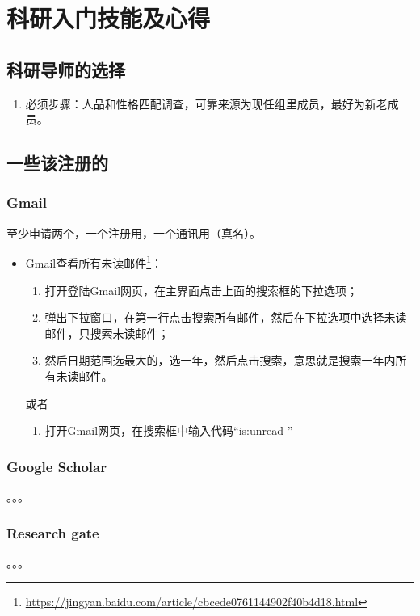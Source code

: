 
\chapter{科研入门技能及心得}
\section{科研导师的选择}
\begin{enumerate}
\item 必须步骤：人品和性格匹配调查，可靠来源为现任组里成员，最好为新老成员。
\end{enumerate}



\section{一些该注册的}
\subsection{Gmail}
 至少申请两个，一个注册用，一个通讯用（真名）。

\begin{itemize}
\item Gmail查看所有未读邮件\footnote{\url{https://jingyan.baidu.com/article/cbcede0761144902f40b4d18.html}}：
\begin{enumerate}
\item 打开登陆Gmail网页，在主界面点击上面的搜索框的下拉选项；
\item 弹出下拉窗口，在第一行点击搜索所有邮件，然后在下拉选项中选择未读邮件，只搜索未读邮件；
\item 然后日期范围选最大的，选一年，然后点击搜索，意思就是搜索一年内所有未读邮件。
\end{enumerate}
或者
\begin{enumerate}
\item 打开Gmail网页，在搜索框中输入代码“is:unread ”
\end{enumerate}
\end{itemize}



\subsection{Google Scholar}
。。。

\subsection{Research gate}
。。。


